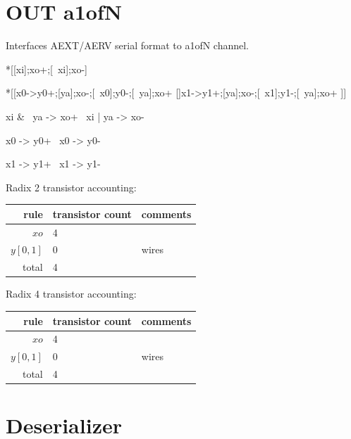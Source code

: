 \documentclass{article}
\begin{document}
\section{OUT a1ofN \label{sec:OUT_a1ofN}}

Interfaces AEXT/AERV serial format to a1ofN channel.

\begin{hse}
*[[xi];xo+;[~xi];xo-]

*[[x0->y0+;[ya];xo-;[~x0];y0-;[~ya];xo+
  []x1->y1+;[ya];xo-;[~x1];y1-;[~ya];xo+
 ]]
\end{hse}

\begin{prs2}
xi & ~ya -> xo+
~xi | ya -> xo-
\end{prs2}

\begin{prs2}
x0 -> y0+
~x0 -> y0-

x1 -> y1+
~x1 -> y1-
\end{prs2}

\noindent
Radix 2 transistor accounting:

\begin{center}
    \begin{tabular}{|r|l|l|}
    \hline
    rule & transistor count & comments \\ \hline
    $xo$ & 4 & \\ \hline
    $y[0,1]$ & 0 & wires \\ \hline
    \hline total & 4 & \\ \hline
    \end{tabular}
\end{center}

\noindent
Radix 4 transistor accounting:

\begin{center}
    \begin{tabular}{|r|l|l|}
    \hline
    rule & transistor count & comments \\ \hline
    $xo$ & 4 & \\ \hline
    $y[0,1]$ & 0 & wires \\ \hline
    \hline total & 4 & \\ \hline
    \end{tabular}
\end{center}

\section{Deserializer \label{sec:DESERIAL}}
\end{document}
